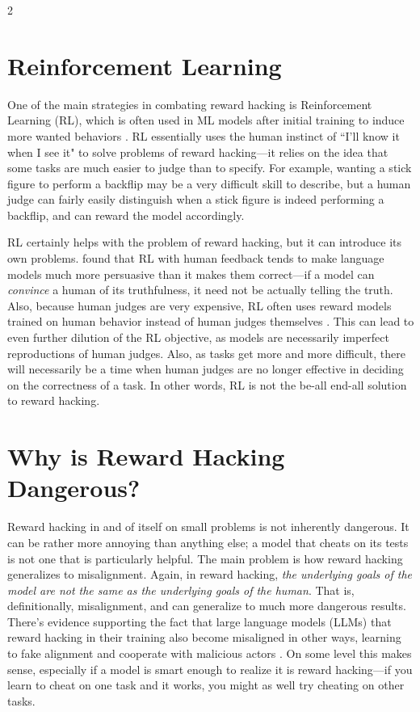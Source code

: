 \documentclass{article}
\begin{document}
\begin{multicols}{2}
\section{Reinforcement Learning}
One of the main strategies in combating reward hacking is Reinforcement Learning (RL), which is often used in ML models after initial training to induce more wanted behaviors \citep{openai2017}. RL essentially uses the human instinct of ``I'll know it when I see it" to solve problems of reward hacking---it relies on the idea that some tasks are much easier to judge than to specify. For example, wanting a stick figure to perform a backflip may be a very difficult skill to describe, but a human judge can fairly easily distinguish when a stick figure is indeed performing a backflip, and can reward the model accordingly. 

RL certainly helps with the problem of reward hacking, but it can introduce its own problems. \citet{wenetal} found that RL with human feedback tends to make language models much more persuasive than it makes them correct---if a model can \emph{convince} a human of its truthfulness, it need not be actually telling the truth. Also, because human judges are very expensive, RL often uses reward models trained on human behavior instead of human judges themselves \citep{ouyang2022traininglanguagemodelsfollow}. This can lead to even further dilution of the RL objective, as models are necessarily imperfect reproductions of human judges. Also, as tasks get more and more difficult, there will necessarily be a time when human judges are no longer effective in deciding on the correctness of a task. In other words, RL is not the be-all end-all solution to reward hacking. 

\section{Why is Reward Hacking Dangerous?}

Reward hacking in and of itself on small problems is not inherently dangerous. It can be rather more annoying than anything else; a model that cheats on its tests is not one that is particularly helpful. The main problem is how reward hacking generalizes to misalignment. Again, in reward hacking, \emph{the underlying goals of the model are not the same as the underlying goals of the human}. That is, definitionally, misalignment, and can generalize to much more dangerous results. There's evidence supporting the fact that large language models (LLMs) that reward hacking in their training also become misaligned in other ways, learning to fake alignment and cooperate with malicious actors \citep{lesswrong-emergent-rh}. On some level this makes sense, especially if a model is smart enough to realize it is reward hacking---if you learn to cheat on one task and it works, you might as well try cheating on other tasks. 


\end{multicols}
\end{document}

